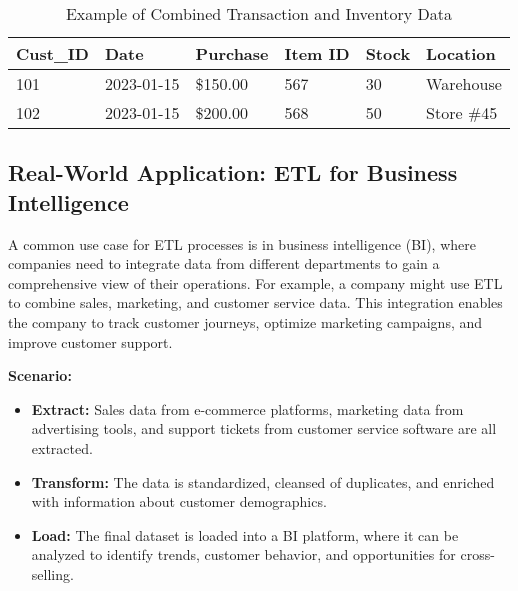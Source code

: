 \documentclass[12pt]{article}
\begin{document}
\begin{table}[h]
    \centering
    \begin{tabular}{|p{2cm}|p{2.5cm}|p{2.5cm}|p{2cm}|p{2cm}|p{3cm}|}
        \hline
        \textbf{Cust\_ID} & \textbf{Date} & \textbf{Purchase} & \textbf{Item ID} & \textbf{Stock} & \textbf{Location} \\ \hline
        101 & 2023-01-15 & \$150.00 & 567 & 30 & Warehouse \\ \hline
        102 & 2023-01-15 & \$200.00 & 568 & 50 & Store \#45 \\ \hline
    \end{tabular}
    \caption{Example of Combined Transaction and Inventory Data}
\end{table}

\subsection{Real-World Application: ETL for Business Intelligence}
A common use case for ETL processes is in business intelligence (BI), where companies need to integrate data from different departments to gain a comprehensive view of their operations. For example, a company might use ETL to combine sales, marketing, and customer service data. This integration enables the company to track customer journeys, optimize marketing campaigns, and improve customer support.

\textbf{Scenario:}
\begin{itemize}
    \item \textbf{Extract:} Sales data from e-commerce platforms, marketing data from advertising tools, and support tickets from customer service software are all extracted.
    \item \textbf{Transform:} The data is standardized, cleansed of duplicates, and enriched with information about customer demographics.
    \item \textbf{Load:} The final dataset is loaded into a BI platform, where it can be analyzed to identify trends, customer behavior, and opportunities for cross-selling.
\end{itemize}
\end{document}
